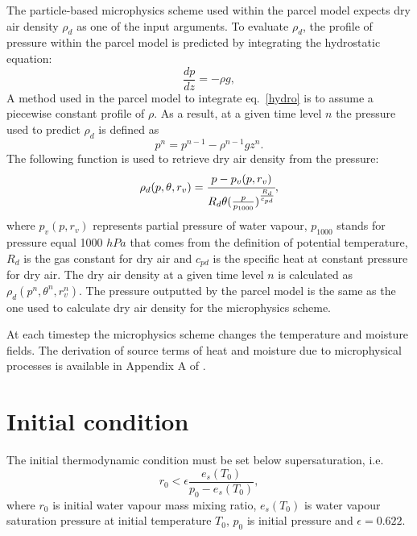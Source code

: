 \documentclass[11pt]{article}
\begin{document}
The particle-based microphysics scheme used within the parcel model expects dry air density $\rho_d$ as one of the input arguments.
To evaluate $\rho_d$, the profile of pressure within the parcel model is predicted by integrating the hydrostatic equation:
\begin{equation}
	\frac{dp}{dz} = -\rho g,
	\label{hydro}
\end{equation}
A method used in the parcel model to integrate eq.~\ref{hydro} is to assume a piecewise constant profile of $\rho$. 
As a result, at a given time level $n$ the pressure used to predict $\rho_d$ is defined as
  \begin{equation*}
    p^n = p^{n-1} - \rho^{n-1} g z^n .
  \end{equation*}
\noindent
The following function is used to retrieve dry air density from the pressure:
\begin{equation}
  \rho_{d}(p, \theta, r_v) = \cfrac{p - p_v(p, r_v)}{ R_d \theta (\frac{p}{p_{1000}})^{\frac{R_d}{c_{pd}}}},
  \label{rho}
\end{equation}
\noindent
where $p_v(p, r_v)$ represents partial pressure of water vapour, 
$p_{1000}$ stands for pressure equal 1000 $hPa$ that comes from the definition of potential temperature,
$R_d$ is the gas constant for dry air and
$c_{pd}$ is the specific heat at constant pressure for dry air.
The dry air density at a given time level $n$ is calculated as $\rho_d(p^n, \theta^n, r_v^n)$. 
The pressure outputted by the parcel model is the same as the one used to calculate dry air density for the microphysics scheme.

At each timestep the microphysics scheme changes the temperature and moisture fields.
The derivation of source terms of heat and moisture due to microphysical processes 
  is available in Appendix A of \citep{Arabas_et_al_2015}.


\section{Initial condition}

The initial thermodynamic condition must be set below supersaturation, i.e.
\begin{equation}
	r_0 < \epsilon \frac{e_s(T_0)}{p_0 - e_s(T_0)},
\end{equation}
\noindent
where $r_0$ is initial water vapour mass mixing ratio, $e_s(T_0)$ is water vapour saturation pressure at initial temperature $T_0$, $p_0$ is initial pressure and $\epsilon = 0.622$.
\end{document}
